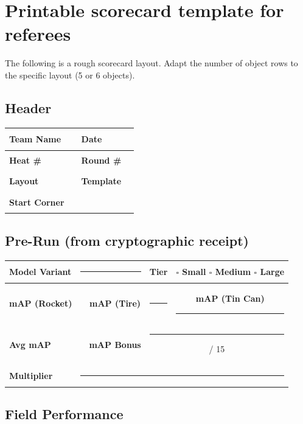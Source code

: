 \documentclass[a4]{article}
\begin{document}
\pagebreak
\section*{Printable scorecard template for referees} 
The following is a rough scorecard layout. Adapt the number of object rows to the specific layout (5 or 6 objects).

\subsection*{Header}

\begin{table}[H]
\centering
\begin{tabular}{|l|p{5cm}|l|p{3cm}|}
\hline
\textbf{Team Name} & \rule{5cm}{0.4pt} & \textbf{Date} & \rule{3cm}{0.4pt} \\
\hline
\textbf{Heat \#} & \rule{5cm}{0.4pt} & \textbf{Round \#} & \rule{3cm}{0.4pt} \\
\hline
\textbf{Layout} & \rule{5cm}{0.4pt} & \textbf{Template} & \rule{3cm}{0.4pt} \\
\hline
\textbf{Start Corner} & \rule{5cm}{0.4pt} & & \\
\hline
\end{tabular}
\end{table}

\subsection*{Pre-Run (from cryptographic receipt)}

\begin{table}[H]
\centering
\begin{tabular}{|l|c|c|c|c|}
\hline
\textbf{Model Variant} & \multicolumn{2}{c|}{\rule{3cm}{0.4pt}} & \textbf{Tier} & $\square$ Small \quad $\square$ Medium \quad $\square$ Large \\
\hline
\textbf{mAP (Rocket)} & \rule{2cm}{0.4pt} & \textbf{mAP (Tire)} & \rule{2cm}{0.4pt} & \textbf{mAP (Tin Can)} \quad \rule{2cm}{0.4pt} \\
\hline
\textbf{Avg mAP} & \rule{2cm}{0.4pt} & \textbf{mAP Bonus} & \multicolumn{2}{c|}{\rule{2cm}{0.4pt} / 15} \\
\hline
\textbf{Multiplier} & \multicolumn{4}{c|}{\rule{2cm}{0.4pt}} \\
\hline
\end{tabular}
\end{table}

\subsection*{Field Performance}
\end{document}
